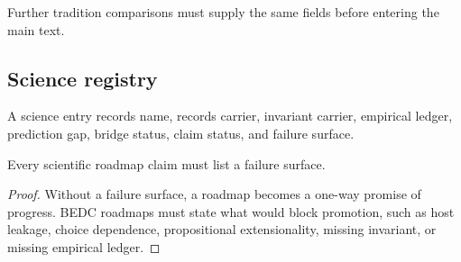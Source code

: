 \begin{corollary}
\label{cor:philosophy-tradition-registry-constrains}
Further tradition comparisons must supply the same fields before
entering the main text.
\end{corollary}


\subsection{Science registry}
\label{subsec:philosophy-science-registry-table}

\begin{definition}
\label{def:philosophy-science-registry-entry}
A science entry records name, records carrier, invariant carrier,
empirical ledger, prediction gap, bridge status, claim status, and
failure surface.
\end{definition}

\begin{theorem}
\label{thm:philosophy-science-roadmaps-require-failure}
Every scientific roadmap claim must list a failure surface.
\end{theorem}
\begin{proof}
Without a failure surface, a roadmap becomes a one-way promise of
progress. BEDC roadmaps must state what would block promotion, such as
host leakage, choice dependence, propositional extensionality, missing
invariant, or missing empirical ledger.
\end{proof}

